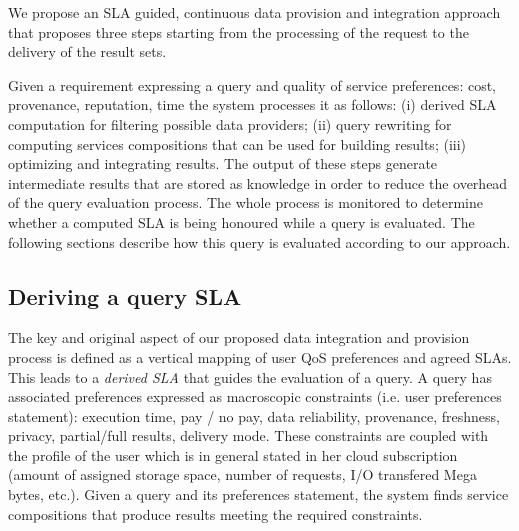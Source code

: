 We propose an SLA guided, continuous data provision and integration approach that proposes three steps  starting from the processing of the request  to the delivery of the result sets.

Given a requirement expressing a query and quality of service preferences: cost, provenance, reputation, time the system processes it  as follows: (i) derived SLA  computation for filtering possible data providers; (ii) query rewriting for computing services compositions that can be used for building results; (iii) optimizing and integrating results. The output of these steps generate intermediate results that are stored as knowledge in order to reduce the overhead of the query evaluation process. The whole process is monitored to determine whether a computed SLA is being honoured while a query is evaluated. 
The following sections describe how this query is evaluated according to our approach. 





\subsection{Deriving a query SLA}
\label{sec:slaModel}

%

The key and original aspect of   our proposed data integration and provision process is  defined as a vertical mapping of user QoS preferences and agreed SLAs. This  leads to a {\em derived SLA} that guides the evaluation of a query. A query has associated preferences  expressed as macroscopic constraints (i.e. user preferences statement): execution time, pay / no pay, data reliability, provenance, freshness, privacy, partial/full results, delivery mode. These constraints are coupled with the profile of the user which is in general stated in her cloud subscription (amount of assigned storage space, number of requests, I/O transfered Mega bytes, etc.). Given a query and its preferences statement, the system  finds  service compositions that produce results   meeting the required constraints. 

